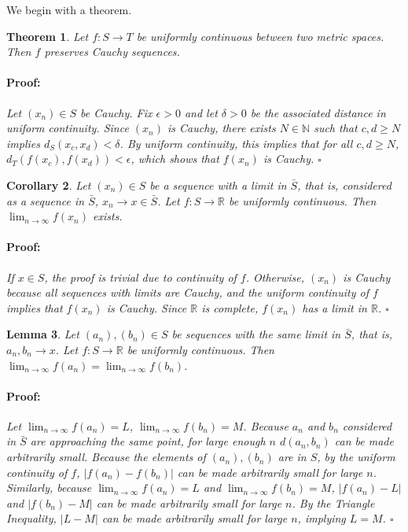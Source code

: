 \documentclass{article}
\newenvironment{proof}{\paragraph{Proof:}}{\hfill$\square$}
\newtheorem{theorem}{Theorem}
\newtheorem{lemma}[theorem]{Lemma}
\newtheorem{corollary}[theorem]{Corollary}
\newcommand{\N}{\mathbb{N}}
\newcommand{\R}{\mathbb{R}}
\begin{document}
We begin with a theorem.

\begin{theorem}
Let $f: S \rightarrow T$ be uniformly continuous between two metric spaces. Then $f$ preserves Cauchy sequences.

\begin{proof}
Let $(x_n) \in S$ be Cauchy. Fix $\epsilon > 0$ and let $\delta > 0$ be the associated distance in uniform continuity. Since $(x_n)$ is Cauchy, there exists $N \in \N$ such that $c, d \geq N$ implies $d_S(x_c, x_d) < \delta$. By uniform continuity, this implies that for all $c, d \geq N$, $d_T(f(x_c), f(x_d)) < \epsilon$, which shows that $f(x_n)$ is Cauchy.
\end{proof}
\end{theorem}

\begin{corollary}
Let $(x_n) \in S$ be a sequence with a limit in $\bar{S}$, that is, considered as a sequence in $\bar{S}$, $x_n \rightarrow x \in \bar{S}$. Let $f: S \rightarrow \R$ be uniformly continuous. Then $\lim_{n \rightarrow \infty} f(x_n)$ exists.

\begin{proof}
If $x \in S$, the proof is trivial due to continuity of $f$. Otherwise, $(x_n)$ is Cauchy because all sequences with limits are Cauchy, and the uniform continuity of $f$ implies that $f(x_n)$ is Cauchy. Since $\R$ is complete, $f(x_n)$ has a limit in $\R$.
\end{proof}
\end{corollary}

\label{FunctionLimitsUnique}
\begin{lemma}
Let $(a_n), (b_n) \in S$ be sequences with the same limit in $\bar{S}$, that is, $a_n, b_n \rightarrow x$. Let $f: S \rightarrow \R$ be uniformly continuous. Then $\lim_{n \rightarrow \infty} f(a_n) = \lim_{n \rightarrow \infty} f(b_n)$.

\begin{proof}
Let $\lim_{n \rightarrow \infty} f(a_n) = L$, $\lim_{n \rightarrow \infty} f(b_n) = M$. Because $a_n$ and $b_n$ considered in $\bar{S}$ are approaching the same point, for large enough $n$ $d(a_n, b_n)$ can be made arbitrarily small. Because the elements of $(a_n), (b_n)$ are in $S$, by the uniform continuity of $f$, $|f(a_n) - f(b_n)|$ can be made arbitrarily small for large $n$. Similarly, because $\lim_{n \rightarrow \infty} f(a_n) = L$ and $\lim_{n \rightarrow \infty} f(b_n) = M$, $|f(a_n)-L|$ and $|f(b_n)-M|$ can be made arbitrarily small for large $n$. By the Triangle Inequality, $|L-M|$ can be made arbitrarily small for large $n$, implying $L = M$.
\end{proof}
\end{lemma}
\end{document}
